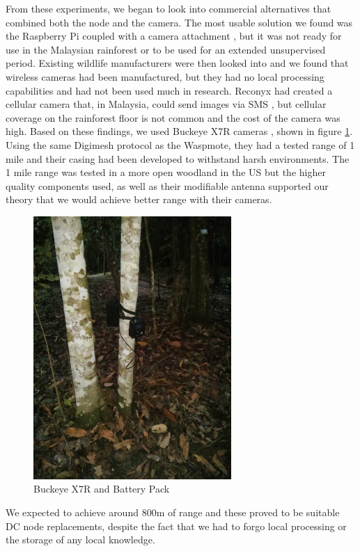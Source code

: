 				From these experiments, we began to look into commercial alternatives that combined both the node and the camera. The most usable solution we found was the Raspberry Pi coupled with a camera attachment \cite{Sarajevo2014}, but it was not ready for use in the Malaysian rainforest or to be used for an extended unsupervised period. Existing wildlife manufacturers were then looked into and we found that wireless cameras had been manufactured, but they had no local processing capabilities and had not been used much in research. Reconyx had created a cellular camera that, in Malaysia, could send images via SMS \cite{rec900c}, but cellular coverage on the rainforest floor is not common and the cost of the camera was high. Based on these findings, we used Buckeye X7R cameras \cite{buckeye}, shown in figure \ref{fig:beye}. Using the same Digimesh protocol as the Waspmote, they had a tested range of 1 mile and their casing had been developed to withstand harsh environments. The 1 mile range was tested in a more open woodland in the US but the higher quality components used, as well as their modifiable antenna supported our theory that we would achieve better range with their cameras.

				\begin{figure}[h]
				\centering
				\includegraphics[width=\textwidth, height=10cm, keepaspectratio]{Chap6/figures/buckeye_cam}
				\caption{Buckeye X7R and Battery Pack}
				\label{fig:beye}
				\end{figure}
				
				We expected to achieve around 800m of range and these proved to be suitable DC node replacements, despite the fact that we had to forgo local processing or the storage of any local knowledge.
